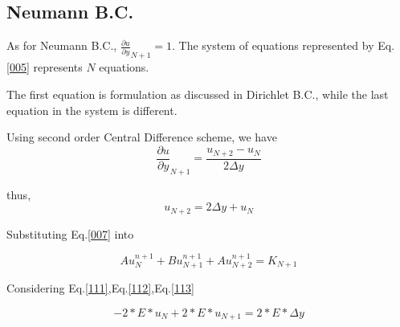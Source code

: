 \subsection{Neumann B.C.}
As for Neumann B.C., $\frac{\partial u}{\partial y}_{N+1}=1$. The system of equations represented by Eq.\eqref{005} represents $N$ equations.

The first equation is formulation as discussed in Dirichlet B.C., while the last equation in the system is different.

Using second order Central Difference scheme, we have
\begin{equation}
\frac{\partial u}{\partial y}_{N+1}=\frac{u_{N+2}-u_N}{2 \Delta y}
\end{equation}

thus,
\begin{equation}
u_{N+2} = 2 \Delta y + u_N \label{007}
\end{equation}

Substituting Eq.\eqref{007} into

\begin{equation}
Au^{n+1}_N + Bu^{n+1}_{N+1} + Au^{n+1}_{N+2} = K_{N+1}
\end{equation}

Considering Eq.\eqref{111},Eq.\eqref{112},Eq.\eqref{113}

\begin{equation}
-2*E*u_N+2*E*u_{N+1} = 2*E*\Delta y
\end{equation}

